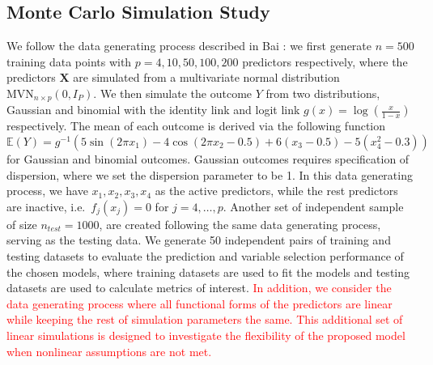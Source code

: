 \documentclass[AMA,STIX1COL,]{WileyNJD-v2}
\begin{document}
\subsection{Monte Carlo Simulation Study}

We follow the data generating process described in Bai \citep{Bai2021}:
we first generate \(n=500\) training data points with
\(p=4, 10, 50, 100, 200\) predictors respectively, where the predictors
\(\boldsymbol{X}\) are simulated from a multivariate normal distribution
\(\text{MVN}_{n\times p}(0, I_{P})\). We then simulate the outcome \(Y\)
from two distributions, Gaussian and binomial with the identity link and
logit link \(g(x) = \log(\frac{x}{1-x})\) respectively. The mean of each
outcome is derived via the following function \[
\mathbb{E}(Y) = g^{-1}(5 \sin(2\pi x_1) - 4 \cos(2\pi x_2 -0.5) + 6(x_3-0.5) - 5(x_4^2 -0.3))
\] for Gaussian and binomial outcomes. Gaussian outcomes requires
specification of dispersion, where we set the dispersion parameter to be
1. In this data generating process, we have \(x_1, x_2, x_3, x_4\) as
the active predictors, while the rest predictors are inactive,
i.e.~\(f_j(x_j) = 0\) for \(j = 4, \dots, p\). Another set of
independent sample of size \(n_{test}=1000\), are created following the
same data generating process, serving as the testing data. We generate
50 independent pairs of training and testing datasets to evaluate the
prediction and variable selection performance of the chosen models,
where training datasets are used to fit the models and testing datasets
are used to calculate metrics of interest.
\textcolor{red}{In addition, we consider the data generating process where all functional forms of the predictors are linear while keeping the rest of simulation parameters the same. This additional set of linear simulations is designed to investigate the flexibility of the proposed model when nonlinear assumptions are not met.}
\end{document}
